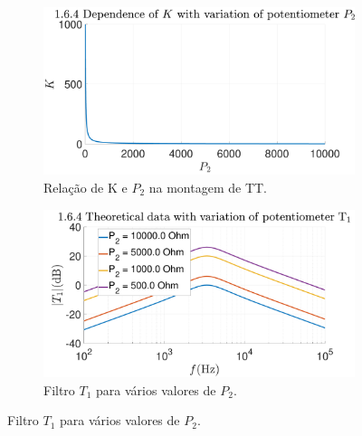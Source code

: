 \begin{figure}[ht]
     \begin{subfigure}[b]{0.45\textwidth}
        \centering
        \includegraphics[width=\linewidth]{Imagens/1_6_4_GainPotentiometer3.pdf}
        \caption{Relação de K e $P_2$ na montagem de TT.}
        \label{fig:K_vs_P2_TT}
     \end{subfigure}
     \hfill
     \begin{subfigure}[b]{0.45\textwidth}
         \centering
         \includegraphics[width=\textwidth]{Imagens/1_6_4_bodeTheoreticalPotentiometer1.pdf}
         \caption{Filtro $T_1$ para vários valores de $P_2$.}
         \label{fig:TT1_Bode_variacao_P2}
     \end{subfigure}


\end{figure}
